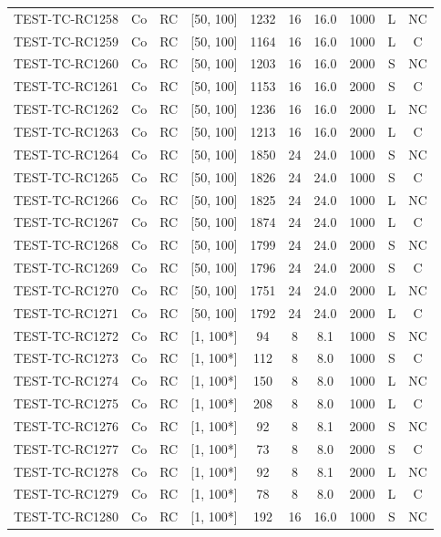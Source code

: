 \begin{longtable}{lccccccccc}
TEST-TC-RC1258 & Co & RC & [50, 100] & 1232 & 16 & 16.0 & 1000 & L & NC \\
TEST-TC-RC1259 & Co & RC & [50, 100] & 1164 & 16 & 16.0 & 1000 & L & C \\
TEST-TC-RC1260 & Co & RC & [50, 100] & 1203 & 16 & 16.0 & 2000 & S & NC \\
TEST-TC-RC1261 & Co & RC & [50, 100] & 1153 & 16 & 16.0 & 2000 & S & C \\
TEST-TC-RC1262 & Co & RC & [50, 100] & 1236 & 16 & 16.0 & 2000 & L & NC \\
TEST-TC-RC1263 & Co & RC & [50, 100] & 1213 & 16 & 16.0 & 2000 & L & C \\
TEST-TC-RC1264 & Co & RC & [50, 100] & 1850 & 24 & 24.0 & 1000 & S & NC \\
TEST-TC-RC1265 & Co & RC & [50, 100] & 1826 & 24 & 24.0 & 1000 & S & C \\
TEST-TC-RC1266 & Co & RC & [50, 100] & 1825 & 24 & 24.0 & 1000 & L & NC \\
TEST-TC-RC1267 & Co & RC & [50, 100] & 1874 & 24 & 24.0 & 1000 & L & C \\
TEST-TC-RC1268 & Co & RC & [50, 100] & 1799 & 24 & 24.0 & 2000 & S & NC \\
TEST-TC-RC1269 & Co & RC & [50, 100] & 1796 & 24 & 24.0 & 2000 & S & C \\
TEST-TC-RC1270 & Co & RC & [50, 100] & 1751 & 24 & 24.0 & 2000 & L & NC \\
TEST-TC-RC1271 & Co & RC & [50, 100] & 1792 & 24 & 24.0 & 2000 & L & C \\
TEST-TC-RC1272 & Co & RC & [1, 100*] & 94 & 8 & 8.1 & 1000 & S & NC \\
TEST-TC-RC1273 & Co & RC & [1, 100*] & 112 & 8 & 8.0 & 1000 & S & C \\
TEST-TC-RC1274 & Co & RC & [1, 100*] & 150 & 8 & 8.0 & 1000 & L & NC \\
TEST-TC-RC1275 & Co & RC & [1, 100*] & 208 & 8 & 8.0 & 1000 & L & C \\
TEST-TC-RC1276 & Co & RC & [1, 100*] & 92 & 8 & 8.1 & 2000 & S & NC \\
TEST-TC-RC1277 & Co & RC & [1, 100*] & 73 & 8 & 8.0 & 2000 & S & C \\
TEST-TC-RC1278 & Co & RC & [1, 100*] & 92 & 8 & 8.1 & 2000 & L & NC \\
TEST-TC-RC1279 & Co & RC & [1, 100*] & 78 & 8 & 8.0 & 2000 & L & C \\
TEST-TC-RC1280 & Co & RC & [1, 100*] & 192 & 16 & 16.0 & 1000 & S & NC \\

\end{longtable}
